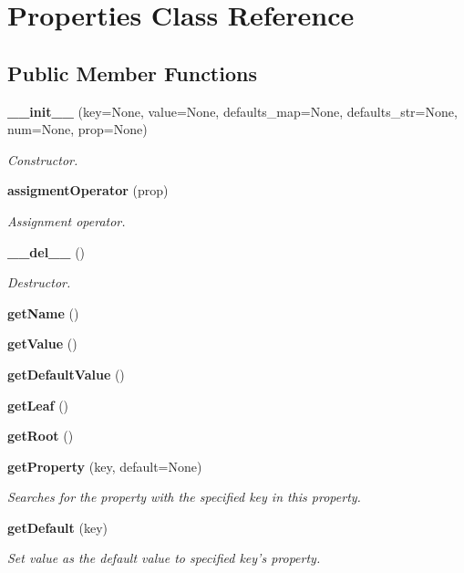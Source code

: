 \section{Properties Class Reference}
\label{classProperties}
\subsection*{Public Member Functions}
\begin{CompactItemize}
\item 
{\bf \_\-\_\-init\_\-\_\-} (key=None, value=None, defaults\_\-map=None, defaults\_\-str=None, num=None, prop=None)
\begin{CompactList}\small\item\em Constructor. \item\end{CompactList}\item 
{\bf assigment\-Operator} (prop)
\begin{CompactList}\small\item\em Assignment operator. \item\end{CompactList}\item 
{\bf \_\-\_\-del\_\-\_\-} ()
\begin{CompactList}\small\item\em Destructor. \item\end{CompactList}\item 
{\bf get\-Name} ()
\item 
{\bf get\-Value} ()
\item 
{\bf get\-Default\-Value} ()
\item 
{\bf get\-Leaf} ()
\item 
{\bf get\-Root} ()
\item 
{\bf get\-Property} (key, default=None)
\begin{CompactList}\small\item\em Searches for the property with the specified key in this property. \item\end{CompactList}\item 
{\bf get\-Default} (key)
\begin{CompactList}\small\item\em Set value as the default value to specified key's property. \item\end{CompactList}\item 

\end{CompactItemize}
